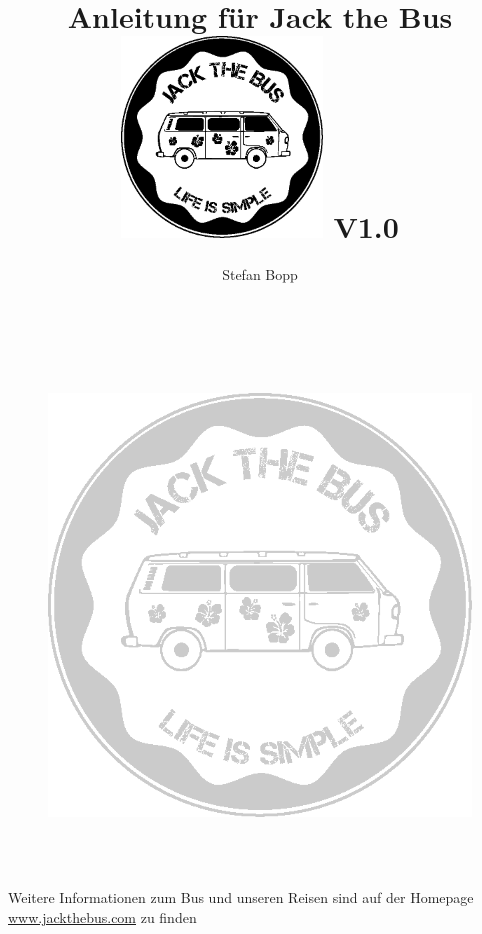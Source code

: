 \documentclass[10pt,nswissgerman,]{article}
\begin{document}
\author{Stefan Bopp}
\title{\Huge Anleitung für Jack the Bus\vspace{2cm}
\includegraphics[width=0.4\textwidth]{../Bilder/Logo/Logo.png}
\centering
\vfill
{\large V1.0}
}
\maketitle
\vfill
{}
\cfoot{\thepage}
\newpage
\tableofcontents

\newpage


\newpage
\listoffigures
\newpage
\begin{figure}[H]
    \centering
    \includegraphics[width=\textwidth,height=14cm, keepaspectratio]{../Bilder/Logo/Logo_trans.png}
    \label{img:Logo}
\end{figure}
\vfill
    \begin{center}
        {\huge  Weitere Informationen zum Bus und unseren Reisen sind auf der Homepage {\url{www.jackthebus.com}} zu finden}
\end{center}
\end{document}

